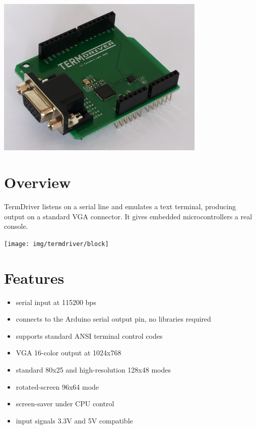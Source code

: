 \documentclass{article}
\begin{document}
\newpage
\begin{center}
\includegraphics[width=0.75\textwidth]{img/termdriver/img1}
\end{center}
\tableofcontents
\listoffigures

\section{Overview}

TermDriver listens on a serial line and emulates a text terminal,
producing output on a standard VGA connector.
It gives embedded microcontrollers a real console.

\begin{center}
\texttt{[image: img/termdriver/block]}
\end{center}

\section{Features}
\begin{itemize}
\item serial input at 115200 bps
\item connects to the Arduino serial output pin, no libraries required
\item supports standard ANSI terminal control codes
\item VGA 16-color output at 1024x768 
\item standard 80x25 and high-resolution 128x48 modes
\item rotated-screen 96x64 mode
\item screen-saver under CPU control
\item input signals 3.3V and 5V compatible
\end{itemize}
\end{document}
